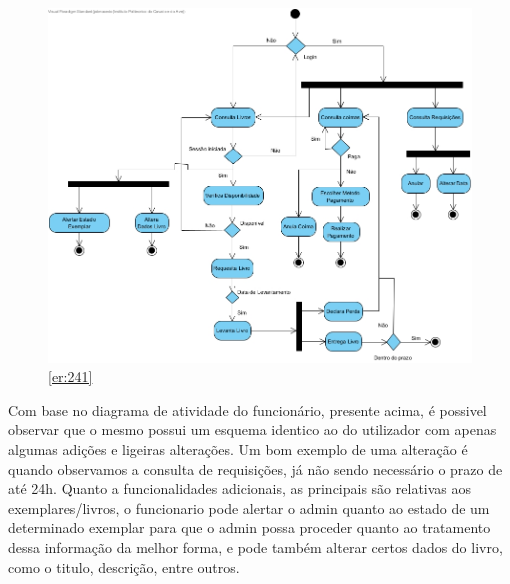 \subsection{}

\begin{figure}[H]
	\centering
	\includegraphics[width=1\linewidth]{./img/Diagramas_A/DA_Funcionario.jpg}  %
	\caption{\ref{er:241}}
	\label{fig:chap241}
\end{figure}

Com base no diagrama de atividade do funcionário, presente acima, é possivel observar que o mesmo possui um esquema identico ao do utilizador com apenas algumas adições e ligeiras alterações.
Um bom exemplo de uma alteração é quando observamos a consulta de requisições, já não sendo necessário o prazo de até 24h.
Quanto a funcionalidades adicionais, as principais são relativas aos exemplares/livros, o funcionario pode alertar o admin quanto ao estado de um determinado exemplar para que o admin possa proceder quanto ao tratamento dessa informação da melhor forma, e pode também alterar certos dados do livro, como o titulo, descrição, entre outros.